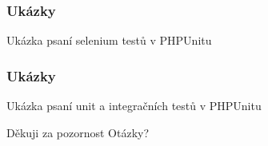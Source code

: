\documentclass{beamer}
\begin{document}
	\begin{frame}
		\frametitle{Ukázky}
		\begin{block}{}
			Ukázka psaní selenium testů v PHPUnitu
		\end{block}
	\end{frame}			
	
	\begin{frame}
		\frametitle{Ukázky}
		\begin{block}{}
			Ukázka psaní unit a integračních testů v PHPUnitu
		\end{block}
	\end{frame}	
	
	\begin{frame}
		\begin{block}{Děkuji za pozornost}
		Otázky?
		\end{block}
	\end{frame}
	
\end{document}
